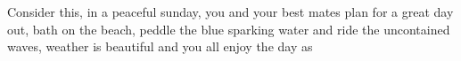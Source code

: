 Consider this, in a peaceful sunday, you and your best mates plan for a great day out, bath on the beach, peddle the blue sparking water and ride the uncontained waves, weather is beautiful and you all enjoy the day as